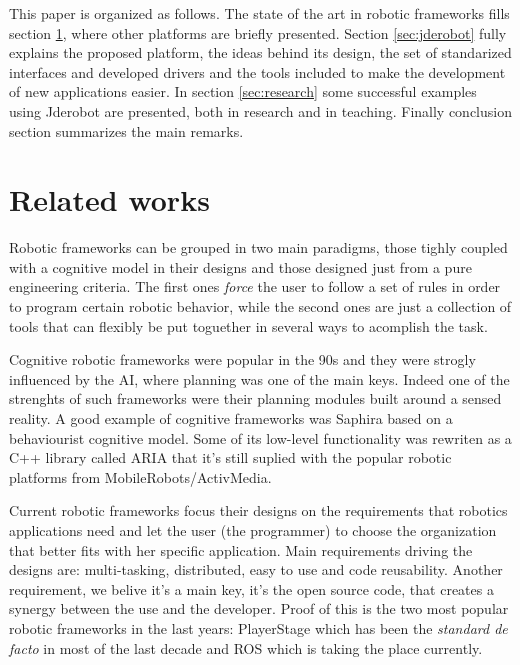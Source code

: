 \documentclass[twocolumn]{svjour3}          %
\begin{document}
This paper is organized as follows. The state of the art in robotic
frameworks fills section \ref{sec:relatedworks}, where other platforms
are briefly presented. Section \ref{sec:jderobot} fully explains the
proposed platform, the ideas behind its design, the set of standarized
interfaces and developed drivers and the tools included to make the
development of new applications easier. In section \ref{sec:research} some successful examples using Jderobot are presented, both in research and in teaching. Finally conclusion section summarizes the main remarks.

\section{Related works}
\label{sec:relatedworks}

Robotic frameworks can be grouped in two main paradigms, those tighly
coupled with a cognitive model in their designs and those designed
just from a pure engineering criteria. The first ones \textit{force}
the user to follow a set of rules in order to program certain robotic
behavior, while the second ones are just a collection of tools that
can flexibly be put toguether in several ways to acomplish the task.

Cognitive robotic frameworks were popular in the 90s and they were
strogly influenced by the AI, where planning was one of the main
keys. Indeed one of the strenghts of such frameworks were their
planning modules built around a sensed reality. A good example of cognitive
frameworks was Saphira \cite{konolige98} based on a behaviourist
cognitive model. Some of its low-level functionality was rewriten as a
C++ library called ARIA \cite{aria} that it's still suplied with the
popular robotic platforms from MobileRobots/ActivMedia.

Current robotic frameworks focus their designs on the requirements
that robotics applications need and let the user (the programmer) to
choose the organization that better fits with her specific
application. Main requirements driving the designs are: multi-tasking, distributed, easy to
use and code reusability. Another requirement, we belive it's a main
key, it's the open source code, that creates a synergy between the use
and the developer. Proof of this is the two most popular robotic
frameworks in the last years: PlayerStage
\cite{Gerkey03,collet05,vaughan2007} which has been the \textit{standard de
facto} in most of the last decade and ROS \cite{quigley09} which is
taking the place currently.
\end{document}
